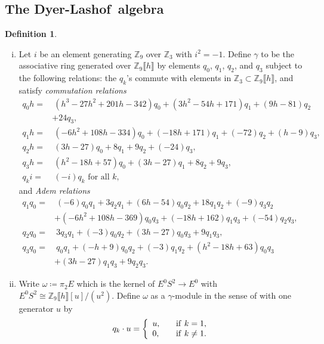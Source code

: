 \documentclass{gtpart}
\theoremstyle{definition}
\newtheorem{defn}[thm]{Definition}
\theoremstyle{remark}
\newcommand{\mb}[1]{\mathbb{#1}}
\newcommand{\DL}{Dyer-Lashof~}
\newcommand{\BZ}{{\mb Z}}
\newcommand{\g}{\gamma}
\begin{document}
\subsection{The \DL algebra}

\begin{defn}
\label{def:go}
 \mbox{}
 \begin{enumerate}[(i)]
  \item \label{go(i)} Let $i$ be an element generating $\BZ_9$ over $\BZ_3$ with $i^2 = -1$.  
  Define $\g$ to be the associative ring generated over $\BZ_9 \llbracket h \rrbracket$ 
  by elements $q_0$, $q_1$, $q_2$, and $q_3$ subject to the following relations: 
  the $q_k$'s commute with elements in $\BZ_3 \subset \BZ_9 \llbracket h \rrbracket$, 
  and satisfy {\em commutation relations} 
  \begin{equation*}
  \begin{split}
   q_0 h = & ~ (h^3 - 27 h^2 + 201 h - 342) q_0 + (3 h^2 - 54 h + 171) q_1 + (9 h - 81) q_2 \\
           & + 24 q_3, \\
   q_1 h = & ~ (-6 h^2 + 108 h - 334) q_0 + (-18 h + 171) q_1 + (-72) q_2 + (h - 9) q_3, \\
   q_2 h = & ~ (3 h - 27) q_0 + 8 q_1 + 9 q_2 + (-24) q_3, \\
   q_3 h = & ~ (h^2 - 18 h + 57) q_0 + (3 h - 27) q_1 + 8 q_2 + 9 q_3, \\
   q_k i = & ~ (-i) q_k \text{~for all~} k, 
  \end{split}
  \end{equation*}
  and {\em Adem relations} 
  \begin{equation*}
  \begin{split}
   q_1q_0 = & ~ (-6) q_0q_1 + 3 q_2q_1 + (6 h - 54) q_0q_2 + 18 q_1q_2 + (-9) q_3q_2 \\
            & + (-6 h^2 + 108 h - 369) q_0q_3 + (-18 h + 162) q_1q_3 + (-54) q_2q_3, \quad~~ \\
   q_2q_0 = & ~ 3 q_3q_1 + (-3) q_0q_2 + (3 h - 27) q_0q_3 + 9 q_1q_3, \\
   q_3q_0 = & ~ q_0q_1 + (-h + 9) q_0q_2 + (-3) q_1q_2 + (h^2 - 18 h + 63) q_0q_3 \\
            & + (3 h - 27) q_1q_3 + 9 q_2q_3.  
  \end{split}
  \end{equation*}

  \item \label{go(ii)} Write $\omega \coloneqq \pi_2 E$ which is the kernel of $E^0 S^2 \to E^0$ with $E^0 S^2 \cong \BZ_9 \llbracket h \rrbracket [u] / (u^2)$.  
  Define $\omega$ as a $\g$-module in the sense of \cite[2.2]{h2p2} with one generator $u$ by 
  \[
   q_k \cdot u = \left\{
   \begin{array}{ll}
     u,  & \quad {\rm if}~k = 1, \\
     0,  & \quad {\rm if}~k \neq 1.  \\
   \end{array}
   \right.
  \]
 \end{enumerate}
\end{defn}
\end{document}
